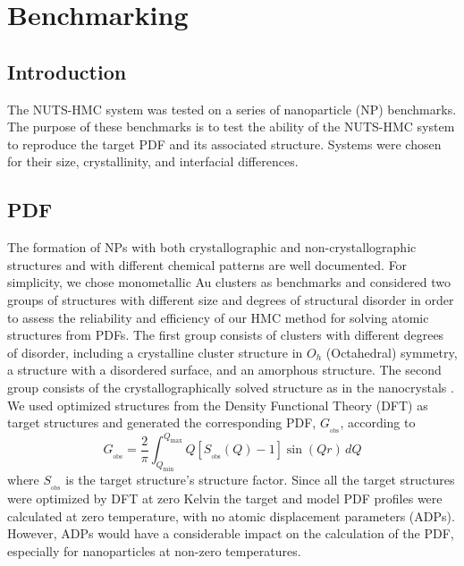 \graphicspath{{./bmk/figures/}}
\chapter{Benchmarking} \label{ch:bmk}
\section{Introduction}
The NUTS-HMC system was tested on a series of nanoparticle (NP) benchmarks.
The purpose of these benchmarks is to test the ability of the NUTS-HMC system to reproduce the target PDF and its associated structure.
Systems were chosen for their size, crystallinity, and interfacial differences.

\section{PDF}
The formation of NPs with both crystallographic and non-crystallographic structures \cite{Marks1994} and with different chemical patterns \cite{Ferrando2008} are well documented.
For simplicity, we chose monometallic Au clusters as benchmarks and considered two groups of structures with different size and degrees of structural disorder in order to assess the reliability and efficiency of our HMC method for solving atomic structures from PDFs.
The first group consists of  clusters with different degrees of disorder, including a crystalline cluster structure in $O_h$ (Octahedral) symmetry, a structure with a disordered surface, and an amorphous structure.
The second group consists of the crystallographically solved  structure as in the  nanocrystals \cite{Jadzinsky2007,Li2008}.
We used optimized structures from the Density Functional Theory (DFT) as target structures and generated the corresponding PDF, $G_{_\mathrm{obs}}$, according to
\begin{equation}
\label{Eq:Gdef}
  G_{_\mathrm{obs}} = \frac{2}{\pi} \int_{Q_\mathrm{min}}^{Q_\mathrm{max}} Q[S_{_\mathrm{obs}}(Q) - 1] \sin{\left (Q r \right )}\, dQ
\end{equation}
where $S_{_\mathrm{obs}}$ is the target structure's structure factor.
Since all the target structures were optimized by DFT at zero Kelvin the target and model PDF profiles were calculated at zero temperature, with no atomic displacement parameters (ADPs).
However, ADPs would have a considerable impact on the calculation of the PDF, especially for nanoparticles at non-zero temperatures.


